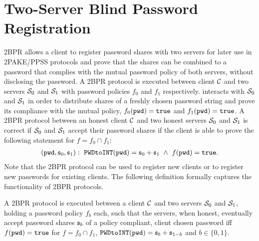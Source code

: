 \section{Two-Server Blind Password Registration} \label{sec:2pake-registration}
\ac{2BPR} allows a client to register password shares with two servers for later use in \ac{2PAKE}/\ac{PPSS} protocols and prove that the shares can be combined to a password that complies with the mutual password policy of both servers, without disclosing the password.
A \ac{2BPR} protocol is executed between client $\mathcal{C}$ and two servers $\mathcal{S}_0$ and $\mathcal{S}_1$ with password policies $f_0$ and $f_1$ respectively.
\Client interacts with $\mathcal{S}_0$ and $\mathcal{S}_1$ in order to distribute shares of a freshly chosen password string \pwd and prove its compliance with the mutual policy, \ie $f_0(\mathtt{pwd})=\mathtt{true}$ and $f_1(\mathtt{pwd})=\mathtt{true}$.
A \ac{2BPR} protocol between an honest client $\mathcal{C}$ and two honest servers $\mathcal{S}_0$ and $\mathcal{S}_1$ is correct if $\mathcal{S}_0$ and $\mathcal{S}_1$ accept their password shares if the client is able to prove the following statement for $f=f_0\cap f_1$:
\begin{align}
  (\mathtt{pwd},\mathfrak{s}_0,\mathfrak{s}_1):~ \texttt{PWDtoINT}(\mathtt{pwd})=\mathfrak{s}_0+\mathfrak{s}_1 ~ \wedge ~ f(\mathtt{pwd})=\mathtt{true}.
  \label{eq:zkppc-pok}
\end{align}
Note that the \ac{2BPR} protocol can be used to register new clients or to register new passwords for existing clients. The following definition formally captures the functionality of \ac{2BPR} protocols.

\begin{definition}\label{def:2bpr}
A \ac{2BPR} protocol is executed between a client $\mathcal{C}$ and two servers $\mathcal{S}_0$ and $\mathcal{S}_{1}$, holding a password policy $f_b$ each, such that the servers, when honest, eventually accept password shares $\mathfrak{s}_b$ of a policy compliant, client chosen password \pwd iff $f(\mathtt{pwd})=\mathtt{true}$ for $f=f_0\cap f_1$, $\texttt{PWDtoINT}(\mathtt{pwd})=\mathfrak{s}_b+\mathfrak{s}_{1-b}$ and $b\in\{0,1\}$.
\eod
\end{definition}

